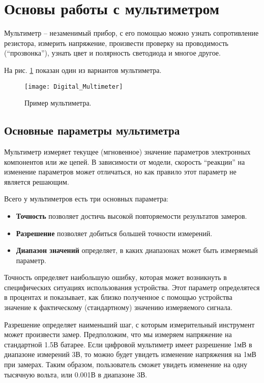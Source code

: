 \documentclass[../main.tex]{subfiles}
\begin{document}
\section{Основы работы с мультиметром}

Мультиметр -- незаменимый прибор, с его помощью можно узнать сопротивление
резистора, измерить напряжение, произвести проверку на проводимость
(``прозвонка''), узнать цвет и полярность светодиода и многое другое.

На рис. \ref{fig:multimeter-example} показан один из вариантов мультиметра.

\begin{figure}[ht]
  \centering
  \texttt{[image: Digital\_Multimeter]}
  \caption{Пример мультиметра.}
  \label{fig:multimeter-example}
\end{figure}

\subsection{Основные параметры мультиметра}

Мультиметр измеряет текущее (мгновенное) значение параметров электронных
компонентов или же цепей.  В зависимости от модели, скорость ``реакции'' на
изменение параметров может отличаться, но как правило этот параметр не является
решающим.

Всего у мультиметров есть три\cite{fluke:multimeter} основных параметра:
\begin{itemize}
\item \textbf{Точность} позволяет достичь высокой повторяемости результатов
  замеров.
\item \textbf{Разрешение} позволяет добиться большей точности измерений.
\item \textbf{Диапазон значений} определяет, в каких диапазонах может быть
  измеряемый параметр.
\end{itemize}

Точность определяет наибольшую ошибку, которая может возникнуть в специфических
ситуациях использования устройства.  Этот параметр определятеся в процентах и
показывает, как близко полученное с помощью устройства значение к фактическому
(стандартному) значению измеряемого сигнала.

Разрешение определяет наименьший шаг, с которым измерительный инструмент может
произвести замер.  Предположим, что мы измеряем напряжение на стандартной 1.5В
батарее.  Если цифровой мультиметр имеет разрешение 1мВ в диапазоне измерений
3В, то можно будет увидеть изменение напряжения на 1мВ при замерах.  Таким
образом, пользователь сможет увидеть изменение на одну тысячную вольта, или
0.001В в диапазоне 3В.
\end{document}
